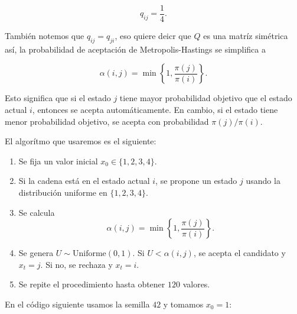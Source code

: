 \documentclass[
]{article}
\providecommand{\tightlist}{%
  \setlength{\itemsep}{0pt}\setlength{\parskip}{0pt}}
\begin{document}
\[
q_{ij}=\frac{1}{4}.
\]

También notemos que \(q_{ij}=q_{ji}\), eso quiere deicr que \(Q\) es una
matríz simétrica así, la probabilidad de aceptación de
Metropolis-Hastings se simplifica a

\[
\alpha(i,j)=\min\left\{1,\frac{\pi(j)}{\pi(i)}\right\}.
\]

Esto significa que si el estado \(j\) tiene mayor probabilidad objetivo
que el estado actual \(i\), entonces se acepta automáticamente. En
cambio, si el estado tiene menor probabilidad objetivo, se acepta con
probabilidad \(\pi(j)/\pi(i)\).

El algorítmo que usaremos es el siguiente:

\begin{enumerate}
\def\labelenumi{\arabic{enumi}.}
\tightlist
\item
  Se fija un valor inicial \(x_0\in\{1,2,3,4\}\).
\item
  Si la cadena está en el estado actual \(i\), se propone un estado
  \(j\) usando la distribución uniforme en \(\{1,2,3,4\}\).
\item
  Se calcula \[
  \alpha(i,j)=\min\left\{1,\frac{\pi(j)}{\pi(i)}\right\}.
  \]
\item
  Se genera \(U\sim\text{Uniforme}(0,1)\). Si \(U<\alpha(i,j)\), se
  acepta el candidato y \(x_t=j\). Si no, se rechaza y \(x_t=i\).
\item
  Se repite el procedimiento hasta obtener \(120\) valores.
\end{enumerate}

En el código siguiente usamos la semilla \(42\) y tomamos \(x_0=1\):
\end{document}
